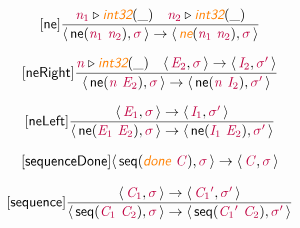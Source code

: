 \documentclass[10pt,leqno,fleqn]{article}
\newcommand{\artVariable}[1]{\mbox{\color{purple}\em #1\/}}
\newcommand{\artConstructor}[1]{\mbox{\sf #1}}
\newcommand{\artSpecial}[1]{\mbox{\color{orange}\sf\em #1}}
\begin{document}
\begin{equation}
\tag*{[\artConstructor{\sf ne}]}
\begin{split}\frac{ \artVariable{n$_{1}$}\triangleright \artSpecial{int32}(\_) \quad  \artVariable{n$_{2}$}\triangleright \artSpecial{int32}(\_) }{\langle\, \artConstructor{\sf ne}(\artVariable{n$_{1}$}\ \artVariable{n$_{2}$}), \artVariable{$\sigma$}\,\rangle \rightarrow \langle\, \artSpecial{ne}(\artVariable{n$_{1}$}\ \artVariable{n$_{2}$}), \artVariable{$\sigma$}\,\rangle }
\end{split}
\end{equation}

\begin{equation}
\tag*{[\artConstructor{\sf neRight}]}
\begin{split}\frac{ \artVariable{n}\triangleright \artSpecial{int32}(\_) \quad \langle\, \artVariable{E$_{2}$}, \artVariable{$\sigma$}\,\rangle \rightarrow \langle\, \artVariable{I$_{2}$}, \artVariable{$\sigma$\/$^\prime$}\,\rangle }{\langle\, \artConstructor{\sf ne}(\artVariable{n}\ \artVariable{E$_{2}$}), \artVariable{$\sigma$}\,\rangle \rightarrow \langle\, \artConstructor{\sf ne}(\artVariable{n}\ \artVariable{I$_{2}$}), \artVariable{$\sigma$\/$^\prime$}\,\rangle }
\end{split}
\end{equation}

\begin{equation}
\tag*{[\artConstructor{\sf neLeft}]}
\begin{split}\frac{\langle\, \artVariable{E$_{1}$}, \artVariable{$\sigma$}\,\rangle \rightarrow \langle\, \artVariable{I$_{1}$}, \artVariable{$\sigma$\/$^\prime$}\,\rangle }{\langle\, \artConstructor{\sf ne}(\artVariable{E$_{1}$}\ \artVariable{E$_{2}$}), \artVariable{$\sigma$}\,\rangle \rightarrow \langle\, \artConstructor{\sf ne}(\artVariable{I$_{1}$}\ \artVariable{E$_{2}$}), \artVariable{$\sigma$\/$^\prime$}\,\rangle }
\end{split}
\end{equation}

\begin{equation}
\tag*{[\artConstructor{\sf sequenceDone}]}
\begin{split}\langle\, \artConstructor{\sf seq}(\artSpecial{done}\ \artVariable{C}), \artVariable{$\sigma$}\,\rangle \rightarrow \langle\, \artVariable{C}, \artVariable{$\sigma$}\,\rangle 
\end{split}
\end{equation}

\begin{equation}
\tag*{[\artConstructor{\sf sequence}]}
\begin{split}\frac{\langle\, \artVariable{C$_{1}$}, \artVariable{$\sigma$}\,\rangle \rightarrow \langle\, \artVariable{C$_{1}$\/$^\prime$}, \artVariable{$\sigma$\/$^\prime$}\,\rangle }{\langle\, \artConstructor{\sf seq}(\artVariable{C$_{1}$}\ \artVariable{C$_{2}$}), \artVariable{$\sigma$}\,\rangle \rightarrow \langle\, \artConstructor{\sf seq}(\artVariable{C$_{1}$\/$^\prime$}\ \artVariable{C$_{2}$}), \artVariable{$\sigma$\/$^\prime$}\,\rangle }
\end{split}
\end{equation}
\end{document}
